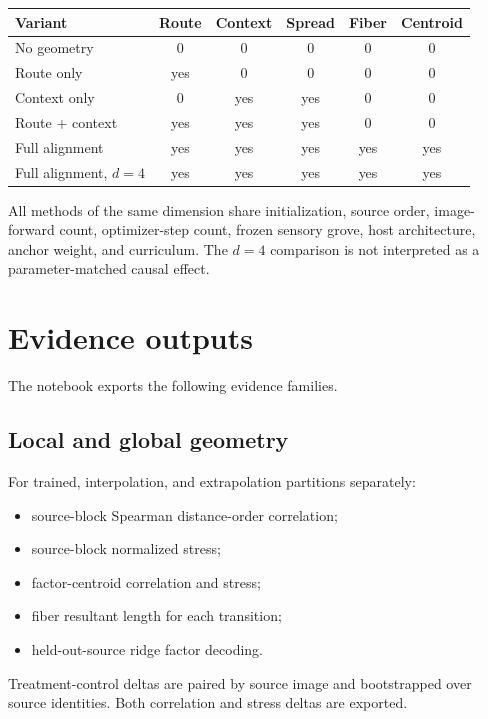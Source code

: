 \documentclass[11pt]{article}
\begin{document}
\begin{center}
\begin{tabular}{lccccc}
\toprule
Variant & Route & Context & Spread & Fiber & Centroid \\
\midrule
No geometry & 0 & 0 & 0 & 0 & 0 \\
Route only & yes & 0 & 0 & 0 & 0 \\
Context only & 0 & yes & yes & 0 & 0 \\
Route + context & yes & yes & yes & 0 & 0 \\
Full alignment & yes & yes & yes & yes & yes \\
Full alignment, $d=4$ & yes & yes & yes & yes & yes \\
\bottomrule
\end{tabular}
\end{center}

All methods of the same dimension share initialization, source order, image-forward count, optimizer-step count, frozen sensory grove, host architecture, anchor weight, and curriculum. The $d=4$ comparison is not interpreted as a parameter-matched causal effect.

\section{Evidence outputs}
The notebook exports the following evidence families.

\subsection{Local and global geometry}
For trained, interpolation, and extrapolation partitions separately:
\begin{itemize}
    \item source-block Spearman distance-order correlation;
    \item source-block normalized stress;
    \item factor-centroid correlation and stress;
    \item fiber resultant length for each transition;
    \item held-out-source ridge factor decoding.
\end{itemize}
Treatment-control deltas are paired by source image and bootstrapped over source identities. Both correlation and stress deltas are exported.
\end{document}
